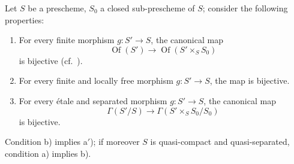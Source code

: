 \begin{proposition}[18.5.4]
\label{IV.18.5.4}
Let $S$ be a prescheme, $S_0$ a closed sub-prescheme of $S$;
consider the following properties:
\begin{enumerate}[label=\emph{\alph*)}]
  \item For every \textup{finite} morphism $g:S'\to S$, the canonical map
\[
\label{IV.18.5.4.1}
\operatorname{Of}(S')\to\operatorname{Of}(S'\times_S S_0)
\tag{18.5.4.1}
  \]
is bijective \textup{(cf.\ )}.
  \item[\textup{a$'$)}] For every \textup{finite and locally free} morphism $g:S'\to S$, the map  is bijective.
  \item For every \textup{\'etale and separated} morphism $g:S'\to S$, the canonical map
\[
\label{IV.18.5.4.2}
\Gamma(S'/S)\to\Gamma(S'\times_S S_0/S_0)
\tag{18.5.4.2}
\]
is bijective.
\end{enumerate}
Condition \textup{b)} implies \textup{a$'$)};
if moreover $S$ is quasi-compact and quasi-separated, condition \textup{a)} implies \textup{b)}.
\end{proposition}

